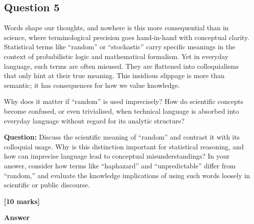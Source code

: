 \documentclass[
  10t,
]{article}
\begin{document}
\subsection{Question 5}\label{question-5}

Words shape our thoughts, and nowhere is this more consequential than in
science, where terminological precision goes hand-in-hand with
conceptual clarity. Statistical terms like ``random'' or ``stochastic''
carry specific meanings in the context of probabilistic logic and
mathematical formalism. Yet in everyday language, such terms are often
misused. They are flattened into colloquialisms that only hint at their
true meaning. This insidious slippage is more than semantic; it has
consequences for how we value knowledge.

Why does it matter if ``random'' is used imprecisely? How do scientific
concepts become confused, or even trivialised, when technical language
is absorbed into everyday language without regard for its analytic
structure?

\textbf{Question:} Discuss the scientific meaning of ``random'' and
contrast it with its colloquial usage. Why is this distinction important
for statistical reasoning, and how can imprecise language lead to
conceptual misunderstandings? In your answer, consider how terms like
``haphazard'' and ``unpredictable'' differ from ``random,'' and evaluate
the knowledge implications of using such words loosely in scientific or
public discourse.

\textbf{{[}10 marks{]}}

\textbf{Answer}
\end{document}
